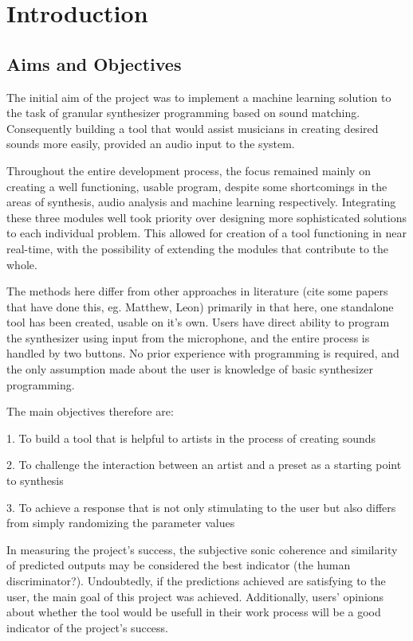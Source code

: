 \chapter{Introduction}
\label{intro}
\section{Aims and Objectives}

The initial aim of the project was to implement a machine learning
solution to the task of granular synthesizer programming based on
sound matching. Consequently building a tool that would assist
musicians in creating desired sounds more easily, provided an audio input to the system.

Throughout the entire development process, the focus remained mainly
on creating a well functioning, usable program, despite some
shortcomings in the areas of synthesis, audio analysis and machine
learning respectively. Integrating these three modules well took
priority over designing more sophisticated solutions to each
individual problem. This allowed for creation of a tool
functioning in near real-time, with the possibility of extending the
modules that contribute to the whole.

The methods here differ from other approaches in literature (cite some
papers that have done this, eg. Matthew, Leon) primarily in that here,
one standalone tool has been created, usable on it's
own. Users have direct ability to program the synthesizer using input
from the microphone, and the entire process is handled by two
buttons. No prior experience with programming is required, and the
only assumption made about the user is knowledge of basic synthesizer
programming.

The main objectives therefore are:

1. To build a tool that is helpful to artists in the process of
creating sounds 

2. To challenge the interaction between an artist and a preset as a
starting point to synthesis 

3. To achieve a response that is not only stimulating to the user but
also differs from simply randomizing the parameter values

In measuring the project's success, the subjective sonic coherence and
similarity of predicted outputs may be considered the best indicator (the
human discriminator?). Undoubtedly, if the predictions achieved are
satisfying to the user, the main goal of this project was
achieved. Additionally, users' opinions about whether the tool would
be usefull in their work process will be a good indicator of the
project's success.

